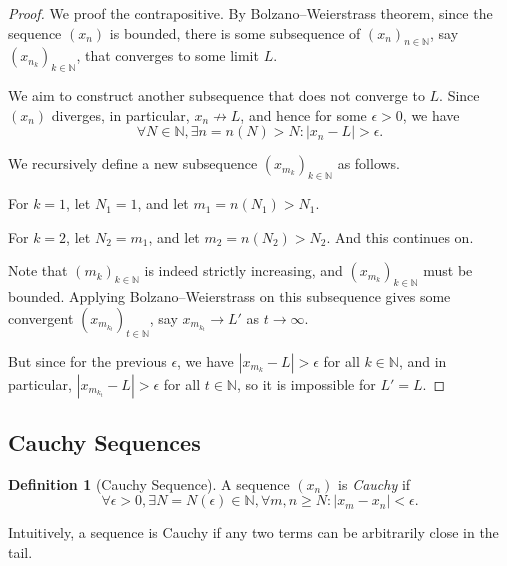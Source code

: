 \documentclass[11pt]{article}
\numberwithin{equation}{section}
\theoremstyle{definition}
\newtheorem{definition}[theorem]{Definition}
\theoremstyle{remark}
\newcommand{\pqty}[1]{\left(#1\right)}
\newcommand{\abs}[1]{\left|#1\right|}
\newcommand{\NN}{\mathbb N}
\newcommand{\notto}{\not\to}
\begin{document}
\begin{proof}
    We proof the contrapositive. By Bolzano--Weierstrass theorem, since the sequence \(\pqty{x_n}\) is bounded, there is some subsequence of \(\pqty{x_n}_{n \in \NN}\), say \(\pqty{x_{n_k}}_{k \in \NN}\), that converges to some limit \(L\).

    We aim to construct another subsequence that does not converge to \(L\). Since \(\pqty{x_n}\) diverges, in particular, \(x_n \notto L\), and hence for some \(\epsilon > 0\), we have
    \[
        \forall N \in \NN, \exists n = n\pqty{N} > N: \abs{x_n - L} > \epsilon.
    \]

    We recursively define a new subsequence \(\pqty{x_{m_k}}_{k \in \NN}\) as follows.

    For \(k = 1\), let \(N_1 = 1\), and let \(m_1 = n\pqty{N_1} > N_1\).
    
    For \(k = 2\), let \(N_2 = m_1\), and let \(m_2 = n\pqty{N_2} > N_2\). And this continues on.

    Note that \(\pqty{m_k}_{k \in \NN}\) is indeed strictly increasing, and \(\pqty{x_{m_k}}_{k \in \NN}\) must be bounded. Applying Bolzano--Weierstrass on this subsequence gives some convergent \(\pqty{x_{m_{k_t}}}_{t \in \NN}\), say \(x_{m_{k_t}} \to L'\) as \(t \to \infty\).
    
    But since for the previous \(\epsilon\), we have \(\abs{x_{m_k} - L} > \epsilon\) for all \(k \in \NN\), and in particular, \(\abs{x_{m_{k_t}} - L} > \epsilon\) for all \(t \in \NN\), so it is impossible for \(L' = L\).
\end{proof}

\subsection{Cauchy Sequences}

\begin{definition}[Cauchy Sequence]\label{analysis-unit-0022}
    \label{def:seq-cauchy}%
    A sequence \(\pqty{x_n}\) is \emph{Cauchy} if
    \[
        \forall \epsilon > 0, \exists N = N \pqty{\epsilon} \in \NN, \forall m, n \geq N: \abs{x_m - x_n} < \epsilon.
    \]

    Intuitively, a sequence is Cauchy if any two terms can be arbitrarily close in the tail.
\end{definition}
\end{document}
